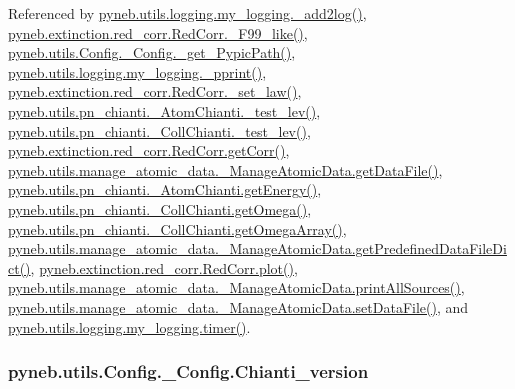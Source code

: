 Referenced by \hyperlink{logging_8py_source_l00059}{pyneb.\-utils.\-logging.\-my\-\_\-logging.\-\_\-add2log()}, \hyperlink{red__corr_8py_source_l00658}{pyneb.\-extinction.\-red\-\_\-corr.\-Red\-Corr.\-\_\-\-F99\-\_\-like()}, \hyperlink{_config_8py_source_l00115}{pyneb.\-utils.\-Config.\-\_\-\-Config.\-\_\-get\-\_\-\-Pypic\-Path()}, \hyperlink{logging_8py_source_l00051}{pyneb.\-utils.\-logging.\-my\-\_\-logging.\-\_\-pprint()}, \hyperlink{red__corr_8py_source_l00176}{pyneb.\-extinction.\-red\-\_\-corr.\-Red\-Corr.\-\_\-set\-\_\-law()}, \hyperlink{pn__chianti_8py_source_l00304}{pyneb.\-utils.\-pn\-\_\-chianti.\-\_\-\-Atom\-Chianti.\-\_\-test\-\_\-lev()}, \hyperlink{pn__chianti_8py_source_l00472}{pyneb.\-utils.\-pn\-\_\-chianti.\-\_\-\-Coll\-Chianti.\-\_\-test\-\_\-lev()}, \hyperlink{red__corr_8py_source_l00211}{pyneb.\-extinction.\-red\-\_\-corr.\-Red\-Corr.\-get\-Corr()}, \hyperlink{manage__atomic__data_8py_source_l00297}{pyneb.\-utils.\-manage\-\_\-atomic\-\_\-data.\-\_\-\-Manage\-Atomic\-Data.\-get\-Data\-File()}, \hyperlink{pn__chianti_8py_source_l00366}{pyneb.\-utils.\-pn\-\_\-chianti.\-\_\-\-Atom\-Chianti.\-get\-Energy()}, \hyperlink{pn__chianti_8py_source_l00507}{pyneb.\-utils.\-pn\-\_\-chianti.\-\_\-\-Coll\-Chianti.\-get\-Omega()}, \hyperlink{pn__chianti_8py_source_l00484}{pyneb.\-utils.\-pn\-\_\-chianti.\-\_\-\-Coll\-Chianti.\-get\-Omega\-Array()}, \hyperlink{manage__atomic__data_8py_source_l00034}{pyneb.\-utils.\-manage\-\_\-atomic\-\_\-data.\-\_\-\-Manage\-Atomic\-Data.\-get\-Predefined\-Data\-File\-Dict()}, \hyperlink{red__corr_8py_source_l00303}{pyneb.\-extinction.\-red\-\_\-corr.\-Red\-Corr.\-plot()}, \hyperlink{manage__atomic__data_8py_source_l00431}{pyneb.\-utils.\-manage\-\_\-atomic\-\_\-data.\-\_\-\-Manage\-Atomic\-Data.\-print\-All\-Sources()}, \hyperlink{manage__atomic__data_8py_source_l00380}{pyneb.\-utils.\-manage\-\_\-atomic\-\_\-data.\-\_\-\-Manage\-Atomic\-Data.\-set\-Data\-File()}, and \hyperlink{logging_8py_source_l00115}{pyneb.\-utils.\-logging.\-my\-\_\-logging.\-timer()}.

\hypertarget{classpyneb_1_1utils_1_1_config_1_1___config_aa13bf0bcb49f9e4b914399b8ddf247d9}{
\subsubsection[{Chianti\-\_\-version}]{\setlength{\rightskip}{0pt plus 5cm}pyneb.\-utils.\-Config.\-\_\-\-Config.\-Chianti\-\_\-version}}\label{classpyneb_1_1utils_1_1_config_1_1___config_aa13bf0bcb49f9e4b914399b8ddf247d9}


